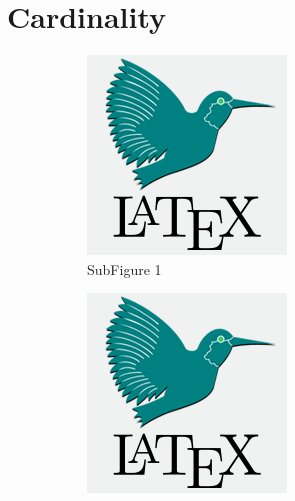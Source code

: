 \documentclass[a4paper,12pt]{article}
\begin{document}
\section{Cardinality}\label{sec:first}
  \blindtext[1]
  \begin{figure}[hbt]
    \begin{center}
      \begin{subfigure}{0.4\textwidth}
        \includegraphics[width=\textwidth]{logo.png}
        \caption{SubFigure 1}
        \label{subfig:logo1}
      \end{subfigure}
      \begin{subfigure}{0.4\textwidth}
        \includegraphics[width=\textwidth]{logo.png}

\end{subfigure}
\end{center}
\end{figure}
\end{document}
